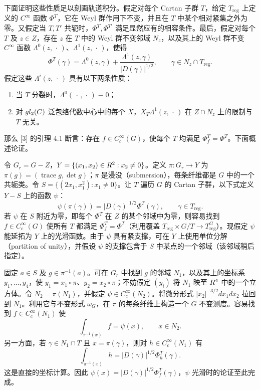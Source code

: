 下面证明这些性质足以刻画轨道积分。假定对每个 Cartan 子群 $T$，给定 $T_{\mathrm{reg}}$ 上定义的 $C^\infty$ 函数 $\Phi^T$，它在 Weyl 群作用下不变，并且在 $T$ 中某个相对紧集之外为零。又假定当 $T,T'$ 共轭时，$\Phi^T,\Phi^{T'}$ 满足显然应有的相容条件。最后，假定对每个 $T$ 及 $z\in Z$，存在 $z$ 在 $T$ 中的 Weyl 群不变邻域 $N_z$，以及其上的 Weyl 群不变 $C^\infty$ 函数 $\Lambda^0(z,\,\cdot\,)$、$\Lambda^1(z,\,\cdot\,)$，使得
\begin{equation}
 \Phi^T(\gamma)=\Lambda^0(z,\gamma)+\frac{\Lambda^1(z,\gamma)}{|D(\gamma)|^{1/2}},
 \qquad\gamma\in N_z\cap T_{\mathrm{reg}}.
 \tag{4}
\end{equation}
假定这些 $\Lambda^i(z,\,\cdot\,)$ 具有以下两条性质：
\begin{enumerate}
\item[(a)] 当 $T$ 分裂时，$\Lambda^0(\,\cdot\,,\,\cdot\,)\equiv0$；
\item[(b)] 对 $gl_2(C)$ 泛包络代数中心中的每个 $X$，$X_T\Lambda^1(z,\,\cdot\,)$ 在 $Z\cap N_z$ 上的限制与 $T$ 无关。
\end{enumerate}
那么 [3] 的引理 4.1 断言：存在 $f\in C_c^\infty(G)$，使每个 $T$ 均满足 $\Phi_f^T=\Phi^T$。下面概述论证。

令 $G_r=G-Z$，$Y=\{(x_1,x_2)\in R^2:x_2\ne0\}$。定义 $\pi:G_r\to Y$ 为 $\pi(g)=(\operatorname{trace}g,\det g)$；$\pi$ 是浸没（submersion），每条纤维都是 $G$ 中的一个共轭类。令 $S=\{(2x_1,x_1^2):x_1\ne0\}$。让 $T$ 遍历 $G$ 的 Cartan 子群，以下式定义 $Y-S$ 上的函数 $\psi$：
\[
 \psi(\pi(\gamma))=|D(\gamma)|^{1/2}\Phi^T(\gamma),\qquad\gamma\in T_{\mathrm{reg}}.
\]
若 $\psi$ 在 $S$ 附近为零，即每个 $\Phi^T$ 在 $Z$ 的某个邻域中为零，则容易找到 $f\in C_c^\infty(G)$ 使所有 $T$ 都满足 $\Phi_f^T=\Phi^T$（利用覆盖 $T_{\mathrm{reg}}\times G/T\to T_{\mathrm{reg}}^G$）。现假定 $\psi$ 能延拓为 $Y$ 上的光滑函数。由于 $\psi$ 具有紧支撑，可在 $Y$ 上使用单位分解（partition of unity），并假设 $\psi$ 的支撑包含于 $S$ 中某点的一个邻域（该邻域稍后指定）。

固定 $a\in S$ 及 $g\in\pi^{-1}(a)$。可在 $G_r$ 中找到 $g$ 的邻域 $N_1$，以及其上的坐标系 $y_1,\ldots,y_4$，使 $y_1=x_1\circ\pi$、$y_2=x_2\circ\pi$；不妨假定 $(y_i)$ 将 $N_1$ 映至 $R^4$ 中的一个立方体。令 $N_2=\pi(N_1)$，并假定 $\psi\in C_c^\infty(N_2)$。将微分形式 $|x_2|^{-3/2}dx_1dx_2$ 拉回到 $N_1$。利用它与不变形式 $\omega_G$，在 $\pi$ 的每条纤维上构造一个 $G$ 不变测度。容易找到 $f\in C_c^\infty(N_1)$ 使
\[
 \int_{\pi^{-1}(x)}f=\psi(x),\qquad x\in N_2.
\]
另一方面，若 $\gamma\in N_1\cap T$ 且 $x=\pi(\gamma)$，则对 $h\in C_c^\infty(N_1)$ 有
\[
 \int_{\pi^{-1}(x)}h=|D(\gamma)|^{1/2}\Phi_h^T(\gamma).
\]
这是直接的坐标计算。因此 $\psi(x)=|D(\gamma)|^{1/2}\Phi_f^T(\gamma)$，$\psi$ 光滑时的论证至此完成。

